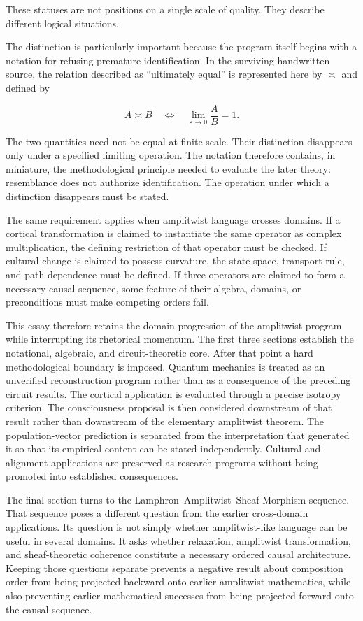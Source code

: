 \documentclass[11pt]{article}
\newcommand{\ulteq}{\mathrel{\text{≍}}}
\begin{document}
These statuses are not positions on a single scale of quality. They describe different logical situations.

The distinction is particularly important because the program itself begins with a notation for refusing premature identification. In the surviving handwritten source, the relation described as ``ultimately equal'' is represented here by $\ulteq$ and defined by

\begin{equation}
A\ulteq B
\quad\Longleftrightarrow\quad
\lim_{\varepsilon\to0}\frac{A}{B}=1.
\end{equation}

The two quantities need not be equal at finite scale. Their distinction disappears only under a specified limiting operation. The notation therefore contains, in miniature, the methodological principle needed to evaluate the later theory: resemblance does not authorize identification. The operation under which a distinction disappears must be stated.

The same requirement applies when amplitwist language crosses domains. If a cortical transformation is claimed to instantiate the same operator as complex multiplication, the defining restriction of that operator must be checked. If cultural change is claimed to possess curvature, the state space, transport rule, and path dependence must be defined. If three operators are claimed to form a necessary causal sequence, some feature of their algebra, domains, or preconditions must make competing orders fail.

This essay therefore retains the domain progression of the amplitwist program while interrupting its rhetorical momentum. The first three sections establish the notational, algebraic, and circuit-theoretic core. After that point a hard methodological boundary is imposed. Quantum mechanics is treated as an unverified reconstruction program rather than as a consequence of the preceding circuit results. The cortical application is evaluated through a precise isotropy criterion. The consciousness proposal is then considered downstream of that result rather than downstream of the elementary amplitwist theorem. The population-vector prediction is separated from the interpretation that generated it so that its empirical content can be stated independently. Cultural and alignment applications are preserved as research programs without being promoted into established consequences.

The final section turns to the Lamphron--Amplitwist--Sheaf Morphism sequence. That sequence poses a different question from the earlier cross-domain applications. Its question is not simply whether amplitwist-like language can be useful in several domains. It asks whether relaxation, amplitwist transformation, and sheaf-theoretic coherence constitute a necessary ordered causal architecture. Keeping those questions separate prevents a negative result about composition order from being projected backward onto earlier amplitwist mathematics, while also preventing earlier mathematical successes from being projected forward onto the causal sequence.
\end{document}
